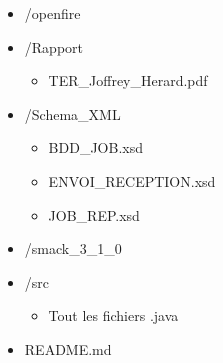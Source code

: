 \documentclass[11pt]{report}
\begin{document}
\begin{itemize}
\begin{itemize}
		\item /openfire
		\item /Rapport \begin{itemize}\item TER\_Joffrey\_Herard.pdf  \end{itemize} 
		\item /Schema\_XML \begin{itemize}\item BDD\_JOB.xsd \item ENVOI\_RECEPTION.xsd \item JOB\_REP.xsd \end{itemize}
		\item /smack\_3\_1\_0
		\item /src \begin{itemize}\item Tout les fichiers .java \end{itemize}
		\item README.md 
\end{itemize}

\end{itemize}
\end{document}
